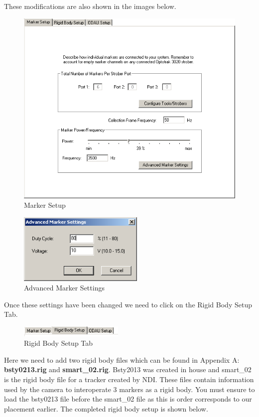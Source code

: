 \documentclass[pdftex,11pt,letterpaper]{article}
\begin{document}
These modifications are also shown in the images below. \\

\begin{figure}[ht!]
\centering
\includegraphics[width=130mm]{./images/marker_setup}
\caption{Marker Setup}
\end{figure}

\begin{figure}[ht!]
\centering
\includegraphics[width=60mm]{./images/adv_marker_setup}
\caption{Advanced Marker Settings}
\end{figure}

Once these settings have been changed we need to click on the Rigid Body Setup Tab. \\

\begin{figure}[ht!]
\centering
\includegraphics[width=50mm]{./images/tab}
\caption{Rigid Body Setup Tab}
\end{figure}

Here we need to add two rigid body files which can be found in Appendix A: \textbf{bsty0213.rig} and \textbf{smart\_02.rig}. Bsty2013 was created in house and smart\_02 is the rigid body file for a tracker created by NDI. These files contain information used by the camera to interoperate 3 markers as a rigid body. You must ensure to load the bsty0213 file before the smart\_02 file as this is order corresponds to our placement earlier. The completed rigid body setup is shown below. 
\end{document}
